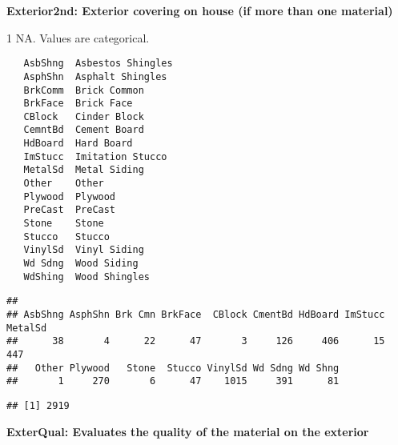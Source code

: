 \documentclass[]{article}
\newenvironment{Shaded}{\begin{snugshade}}{\end{snugshade}}
\newcommand{\KeywordTok}[1]{\textcolor[rgb]{0.13,0.29,0.53}{\textbf{#1}}}
\newcommand{\DecValTok}[1]{\textcolor[rgb]{0.00,0.00,0.81}{#1}}
\newcommand{\StringTok}[1]{\textcolor[rgb]{0.31,0.60,0.02}{#1}}
\newcommand{\CommentTok}[1]{\textcolor[rgb]{0.56,0.35,0.01}{\textit{#1}}}
\newcommand{\OperatorTok}[1]{\textcolor[rgb]{0.81,0.36,0.00}{\textbf{#1}}}
\newcommand{\NormalTok}[1]{#1}
\begin{document}
\textbf{Exterior2nd: Exterior covering on house (if more than one
material)}

1 NA. Values are categorical.

\begin{verbatim}
   AsbShng  Asbestos Shingles
   AsphShn  Asphalt Shingles
   BrkComm  Brick Common
   BrkFace  Brick Face
   CBlock   Cinder Block
   CemntBd  Cement Board
   HdBoard  Hard Board
   ImStucc  Imitation Stucco
   MetalSd  Metal Siding
   Other    Other
   Plywood  Plywood
   PreCast  PreCast
   Stone    Stone
   Stucco   Stucco
   VinylSd  Vinyl Siding
   Wd Sdng  Wood Siding
   WdShing  Wood Shingles
\end{verbatim}

\begin{Shaded}
\end{Shaded}

\begin{verbatim}
## 
## AsbShng AsphShn Brk Cmn BrkFace  CBlock CmentBd HdBoard ImStucc MetalSd 
##      38       4      22      47       3     126     406      15     447 
##   Other Plywood   Stone  Stucco VinylSd Wd Sdng Wd Shng 
##       1     270       6      47    1015     391      81
\end{verbatim}

\begin{Shaded}
\end{Shaded}

\begin{verbatim}
## [1] 2919
\end{verbatim}

\textbf{ExterQual: Evaluates the quality of the material on the
exterior}
\end{document}
